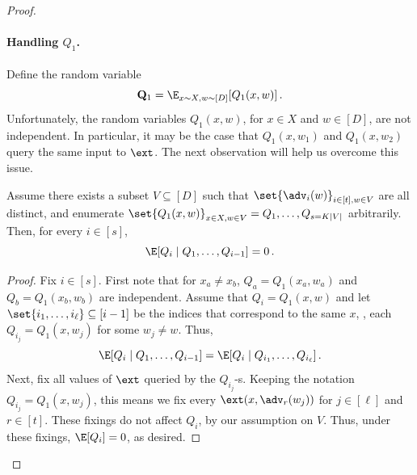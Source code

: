 \begin{proof}
\paragraph{Handling $Q_1$.} Define the random variable
\[
\mathbf{Q}_1 = \E_{x \sim X,w \sim [D]}[Q_{1}(x,w)]\,.
\]
Unfortunately, the random variables $Q_{1}(x,w)$, 
for $x \in X$ and
$w \in [D]$, are not independent. In particular, it may be the case that $Q_1(x,w_1)$
and $Q_1(x,w_2)$ query the same input to $\ext$.
The next observation will help us overcome
this issue.
\begin{claim}\label{claim:partition}
Assume there exists a subset $V \subseteq [D]$ such that 
$\set{\adv_{i}(w)}_{i \in [t],w \in V}$ are all distinct, and enumerate
$\set{Q_1(x,w)}_{x \in X,w \in V} = Q_{1},\ldots,Q_{s = K|V|}$ arbitrarily. Then, for every $i \in [s]$,
\[\E[Q_{i} \mid Q_{1},\ldots,Q_{i-1}]=0\,.\]
\end{claim}
\begin{proof}
Fix $i \in [s]$.
First note that for $x_a \neq x_b$, $Q_{a} = Q_1(x_a,w_a)$ and $Q_{b} = Q_1(x_b,w_b)$ 
are independent. Assume that $Q_i = Q_{1}(x,w)$
and let $\set{i_1,\ldots,i_\ell} \subseteq [i-1]$ be the indices that correspond to the same $x$,
\ie, each $Q_{i_j} = Q_{1}(x,w_j)$ for some $w_j \neq w$. Thus,
\[\E[Q_{i} \mid Q_{1},\ldots,Q_{i-1}]=\E[Q_{i} \mid Q_{i_1},\ldots,Q_{i_\ell}]\,.\]
Next, fix all values of $\ext$ queried by the $Q_{i_j}$-s. Keeping the notation
$Q_{i_j} = Q_1(x,w_j)$, this means we fix every
$\ext(x,\adv_{r}(w_j))$ for $j \in [\ell]$ and $r \in [t]$. These fixings do not
affect $Q_i$, by our assumption on $V$. Thus, under these fixings, $\E[Q_i] = 0$, 
as desired.
\end{proof}


\end{proof}
